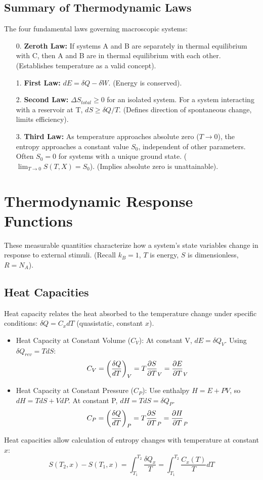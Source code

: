 \documentclass[10pt, letterpaper]{article}
\begin{document}
\subsection{Summary of Thermodynamic Laws}
The four fundamental laws governing macroscopic systems:
\begin{enumerate}
    \item[0.] \textbf{Zeroth Law:} If systems A and B are separately in thermal equilibrium with C, then A and B are in thermal equilibrium with each other. (Establishes temperature as a valid concept).
    \item[1.] \textbf{First Law:} $dE = \delta Q - \delta W$. (Energy is conserved).
    \item[2.] \textbf{Second Law:} $\Delta S_{total} \ge 0$ for an isolated system. For a system interacting with a reservoir at T, $dS \ge \delta Q / T$. (Defines direction of spontaneous change, limits efficiency).
    \item[3.] \textbf{Third Law:} As temperature approaches absolute zero ($T \to 0$), the entropy approaches a constant value $S_0$, independent of other parameters. Often $S_0 = 0$ for systems with a unique ground state. ($\lim_{T \to 0} S(T, X) = S_0$). (Implies absolute zero is unattainable).
\end{enumerate}

\section{Thermodynamic Response Functions}
These measurable quantities characterize how a system's state variables change in response to external stimuli. (Recall $k_B = 1$, $T$ is energy, $S$ is dimensionless, $R=N_A$).

\subsection{Heat Capacities}
Heat capacity relates the heat absorbed to the temperature change under specific conditions: $\delta Q = C_x dT$ (quasistatic, constant $x$).
\begin{itemize}
    \item Heat Capacity at Constant Volume ($C_V$): At constant V, $dE = \delta Q_V$. Using $\delta Q_{rev} = TdS$:
        \begin{equation}
            C_V = \left(\frac{\delta Q}{dT}\right)_V = T\pdv{S}{T}_{V} = \pdv{E}{T}_{V}
        \end{equation}
    \item Heat Capacity at Constant Pressure ($C_P$): Use enthalpy $H = E + PV$, so $dH = TdS + VdP$. At constant P, $dH = TdS = \delta Q_P$.
        \begin{equation}
            C_P = \left(\frac{\delta Q}{dT}\right)_P = T\pdv{S}{T}_{P} = \pdv{H}{T}_{P}
        \end{equation}
\end{itemize}
Heat capacities allow calculation of entropy changes with temperature at constant $x$:
\begin{equation}
    S(T_2, x) - S(T_1, x) = \int_{T_1}^{T_2} \frac{\delta Q_x}{T} = \int_{T_1}^{T_2} \frac{C_x(T)}{T} dT
\end{equation}
\end{document}
